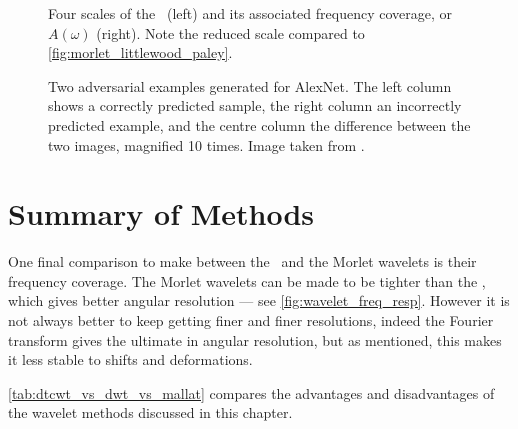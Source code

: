   \begin{figure}
    \subfloat{\makebox[0.6\textwidth][c]{%
    }}
    \subfloat{\makebox[0.4\textwidth][c]{%
    }}
    \caption[\DTCWT\ basis functions and their frequency coverage]
    {Four scales of the \DTCWT\ (left) and its associated frequency
    coverage, or $A(\omega)$ (right). Note the reduced scale compared to \autoref{fig:morlet_littlewood_paley}.}
    \label{fig:dtcwt_lwoodpaley}
  \end{figure}

  \begin{figure}
    \centering
    \caption[Two adversarial examples generated for AlexNet]
    {Two adversarial examples generated for AlexNet. The left column
    shows a correctly predicted sample, the right column an incorrectly
    predicted example, and the centre column the difference between the two
    images, magnified 10 times. Image taken from
    \citep{szegedy_intriguing_2013}.}
    \label{fig:difference}
  \end{figure}
\section{Summary of Methods}
  One final comparison to make between the \DTCWT\ and the Morlet wavelets is
  their frequency coverage. The Morlet wavelets can be made to be tighter than
  the \DTCWT, which gives better angular resolution --- see
  \autoref{fig:wavelet_freq_resp}. However it is not always
  better to keep getting finer and finer resolutions, indeed the Fourier
  transform gives the ultimate in angular resolution, but as mentioned, this
  makes it less stable to shifts and deformations. 

  \autoref{tab:dtcwt_vs_dwt_vs_mallat} compares the advantages and
  disadvantages of the wavelet methods discussed in this chapter.

